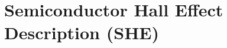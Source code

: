 \documentclass{../lab}
\begin{document}
\maketitle

\tableofcontents

\section{Semiconductor Hall Effect Description (SHE)}
\end{document}
